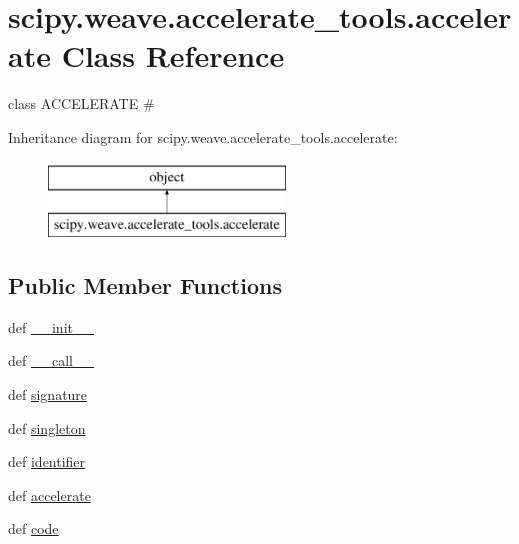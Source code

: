 \hypertarget{classscipy_1_1weave_1_1accelerate__tools_1_1accelerate}{}\section{scipy.\+weave.\+accelerate\+\_\+tools.\+accelerate Class Reference}
\label{classscipy_1_1weave_1_1accelerate__tools_1_1accelerate}


class A\+C\+C\+E\+L\+E\+R\+A\+T\+E \#  


Inheritance diagram for scipy.\+weave.\+accelerate\+\_\+tools.\+accelerate\+:\begin{figure}[H]
\begin{center}
\leavevmode
\includegraphics[height=2.000000cm]{classscipy_1_1weave_1_1accelerate__tools_1_1accelerate}
\end{center}
\end{figure}
\subsection*{Public Member Functions}
\begin{DoxyCompactItemize}
\item 
def \hyperlink{classscipy_1_1weave_1_1accelerate__tools_1_1accelerate_ac7b2a9c25a396e32f49a8288b45b4d4d}{\+\_\+\+\_\+init\+\_\+\+\_\+}
\item 
def \hyperlink{classscipy_1_1weave_1_1accelerate__tools_1_1accelerate_a130475dd958cde545ce01de775b945cf}{\+\_\+\+\_\+call\+\_\+\+\_\+}
\item 
def \hyperlink{classscipy_1_1weave_1_1accelerate__tools_1_1accelerate_ae7f41a30a263980d30c716c501548c4b}{signature}
\item 
def \hyperlink{classscipy_1_1weave_1_1accelerate__tools_1_1accelerate_a9e06684077a55822b56b488acd477e5c}{singleton}
\item 
def \hyperlink{classscipy_1_1weave_1_1accelerate__tools_1_1accelerate_a48dc324c3a28753cdc9846479ebdf8ec}{identifier}
\item 
def \hyperlink{classscipy_1_1weave_1_1accelerate__tools_1_1accelerate_a311542f97ec02b1f4f34cc19df3f0f67}{accelerate}
\item 
def \hyperlink{classscipy_1_1weave_1_1accelerate__tools_1_1accelerate_a02ffc2cf3b4861ce5b1711008430f3e5}{code}
\end{DoxyCompactItemize}
